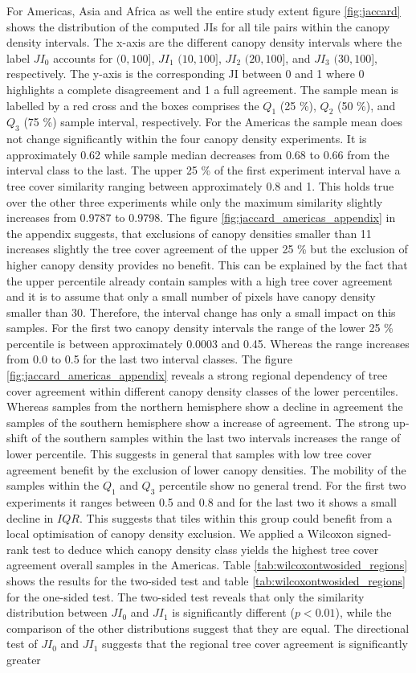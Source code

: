 			For Americas, Asia and Africa as well the entire study extent figure \ref{fig:jaccard} shows the distribution of the computed \acp{JI} for all tile pairs within the canopy density intervals. The x-axis are the different canopy density intervals where the label $JI_0$ accounts for $(0,100]$, $JI_1$ $(10,100]$, $JI_2$ $(20,100]$, and $JI_3$ $(30,100]$, respectively. The y-axis is the corresponding \ac{JI} between 0 and 1 where 0 highlights a complete disagreement and 1 a full agreement. The sample mean is labelled by a red cross and the boxes comprises the $Q_1$ (25 \%), $Q_2$ (50 \%), and $Q_3$ (75 \%) sample interval, respectively. For the Americas the sample mean does not change significantly within the four canopy density experiments. It is approximately 0.62 while sample median decreases from 0.68 to 0.66 from the interval class to the last. The upper 25 \% of the first experiment interval have a tree cover similarity ranging between approximately 0.8 and 1. This holds true over the other three experiments while only the maximum similarity slightly increases from 0.9787 to 0.9798. The figure \ref{fig:jaccard_americas_appendix} in the appendix suggests, that exclusions of canopy densities smaller than 11 increases slightly the tree cover agreement of the upper 25 \% but the exclusion of higher canopy density provides no benefit. This can be explained by the fact that the upper percentile already contain samples with a high tree cover agreement and it is to assume that only a small number of pixels have canopy density smaller than 30. Therefore, the interval change has only a small impact on this samples. For the first two canopy density intervals the range of the lower 25 \% percentile is between approximately 0.0003 and 0.45. Whereas the range increases from 0.0 to 0.5 for the last two interval classes. The figure \ref{fig:jaccard_americas_appendix} reveals a strong regional dependency of tree cover agreement within different canopy density classes of the lower percentiles. Whereas samples from the northern hemisphere show a decline in agreement the samples of the southern hemisphere show a increase of agreement. The strong up-shift of the southern samples within the last two intervals increases the range of lower percentile. This suggests in general that samples with low tree cover agreement benefit by the exclusion of lower canopy densities. The mobility of the samples within the $Q_1$ and $Q_3$ percentile show no general trend. For the first two experiments it ranges between 0.5 and 0.8 and for the last two it shows a small decline in $IQR$. This suggests that tiles within this group could benefit from a local optimisation of canopy density exclusion. We applied a Wilcoxon signed-rank test to deduce which canopy density class yields the highest tree cover agreement overall samples in the Americas. Table \ref{tab:wilcoxontwosided_regions} shows the results for the two-sided test and table \ref{tab:wilcoxontwosided_regions} for the one-sided test. The two-sided test reveals that only the similarity distribution between $JI_0$ and $JI_1$ is significantly different ($p<0.01$), while the comparison of the other distributions suggest that they are equal. The directional test of $JI_0$ and $JI_1$ suggests that the regional tree cover agreement is significantly greater 